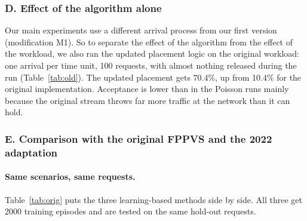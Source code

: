 \subsubsection*{D. Effect of the algorithm alone}

Our main experiments use a different arrival process from our first version
(modification M1). So to separate the effect of the algorithm from the effect of
the workload, we also ran the updated placement logic on the original workload:
one arrival per time unit, 100 requests, with almost nothing released during the
run (Table~\ref{tab:old}). The updated placement gets 70.4\%, up from 10.4\% for
the original implementation. Acceptance is lower than in the Poisson runs mainly
because the original stream throws far more traffic at the network than it can
hold.

\begin{table}[H]
\centering\small
\caption{Original workload (one arrival per time unit), 5 seeds. The upper
rows are from our first implementation; the lower rows use the updated
environment and placement logic.}
\label{tab:old}

\end{table}

\subsubsection*{E. Comparison with the original FPPVS and the 2022 adaptation}\label{sec:paper}

\paragraph{Same scenarios, same requests.} Table~\ref{tab:orig} puts the three
learning-based methods side by side. All three get 2000 training episodes and
are tested on the same hold-out requests.

\begin{table}[H]
\centering\small
\caption{Original FPPVS, the 2022 adaptation and updated FPPVS on identical
scenarios, mean over \numSeeds{} seeds. $^\ast$Gain = updated FPPVS minus the
better of the other two, in percentage points.}
\label{tab:orig}

\end{table}

